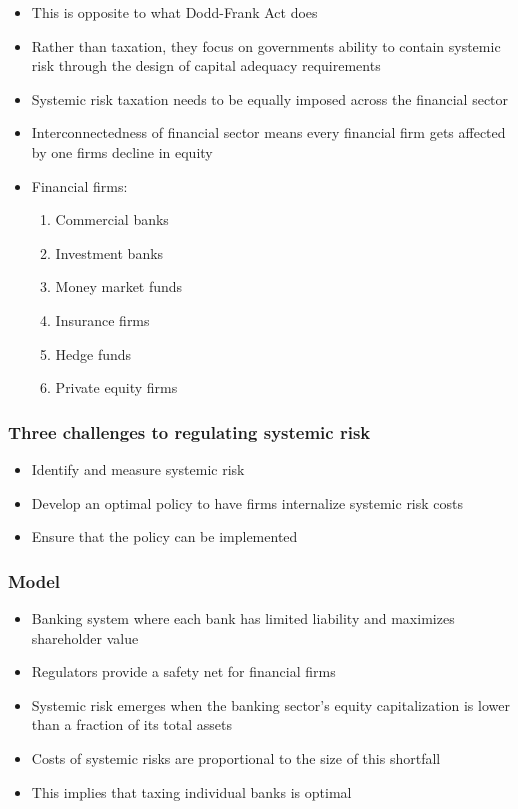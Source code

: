 \documentclass[11pt]{beamer}
\begin{document}

\begin{frame}
\begin{itemize}\itemsep10pt
\item This is opposite to what Dodd-Frank Act does
\item Rather than taxation, they focus on governments ability to contain systemic risk through the design of capital adequacy requirements
\item Systemic risk taxation needs to be equally imposed across the financial sector
\item Interconnectedness of financial sector means every financial firm gets affected by one firms decline in equity
\item Financial firms:
\begin{enumerate}\itemsep5pt
\item Commercial banks
\item Investment banks
\item Money market funds
\item Insurance firms
\item Hedge funds
\item Private equity firms
\end{enumerate}
\end{itemize}
\end{frame}


\begin{frame}
\frametitle{Three challenges to regulating systemic risk}
\begin{itemize}\itemsep10pt
\item Identify and measure systemic risk
\item Develop an optimal policy to have firms internalize systemic risk costs
\item Ensure that the policy can be implemented
\end{itemize}
\end{frame}


\begin{frame}
\frametitle{Model}
\begin{itemize}\itemsep10pt
\item Banking system where each bank has limited liability and maximizes shareholder value
\item Regulators provide a safety net for financial firms
\item Systemic risk emerges when the banking sector's equity capitalization is lower than a fraction of its total assets
\item Costs of systemic risks are proportional to the size of this shortfall
\item This implies that taxing individual banks is optimal
\end{itemize}
\end{frame}
\end{document}

